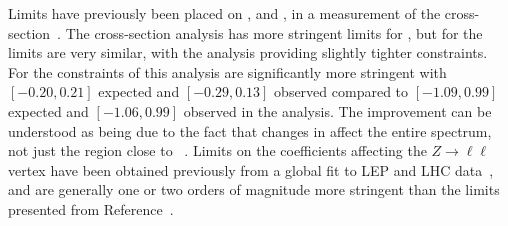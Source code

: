 Limits have previously been placed on \chg, \chgtil{} and \chwb{}, in
a measurement of the
\HFourL{} cross-section~\cite{Aad:2020mkp}. The \HFourL{} cross-section analysis has more stringent limits for \chg{}, but for \chgtil{} the limits are very similar,
with the \mFourL{} analysis providing slightly tighter constraints. For
\chwb{} the constraints of this analysis are significantly more
stringent
with $[ -0.20, 0.21]$ expected and $[-0.29,0.13]$ observed compared
to $[-1.09,0.99]$ expected and $[-1.06,0.99]$ observed in the
\HFourL{} analysis.
The improvement can be understood as being due to the fact that changes in
\chwb{} affect the entire \mFourL{} spectrum, not just the region
close to \mH{}~\cite{m4l2021_paper}. 
Limits on the coefficients affecting the $Z\to \ell\ell$ vertex have been obtained 
previously from a global fit to LEP and LHC data~\cite{Ellis:2018gqa}, and are generally 
one or two orders of magnitude more stringent than the limits presented from Reference~\cite{m4l2021_paper}.

